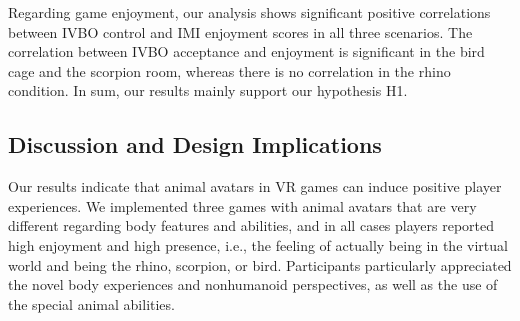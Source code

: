\documentclass{sigchi}
\begin{document}
Regarding game enjoyment, our analysis shows significant positive correlations between IVBO control and IMI enjoyment scores in all three scenarios. The correlation between IVBO acceptance and enjoyment is significant in the bird cage and the scorpion room, whereas there is no correlation in the rhino condition.
In sum, our results mainly support our hypothesis H1. 















\subsection{Discussion and Design Implications}

Our results indicate that animal avatars in VR games can induce positive player experiences. We implemented three games with animal avatars that are very different regarding body features and abilities, and in all cases players reported high enjoyment and high presence, i.e., the feeling of actually being in the virtual world and being the rhino, scorpion, or bird. Participants particularly appreciated the novel body experiences and nonhumanoid perspectives, as well as the use of the special animal abilities.
\end{document}
